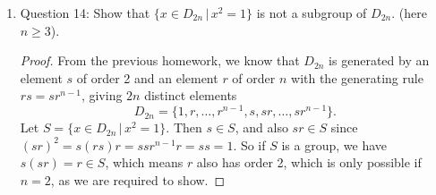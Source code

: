 \documentclass{article}
\begin{document}
\begin{enumerate}
\begin{enumerate}
\begin{proof}
          The given set of elements is not a group because it is not closed
          under addition. In particular, $(1,1)$ and $(-1,0)$ are in the set
          but their sum $(0,1)$ is not.
          inverse
        \end{proof}

      \item Question 14: Show that $\{x\in D_{2n}\,|\,x^2=1\}$ is not a
        subgroup of $D_{2n}$. (here $n\geq3$).

        \begin{proof}
          From the previous homework, we know that $D_{2n}$ is generated by
          an element $s$ of order 2 and an element $r$ of order $n$ with
          the generating rule $rs=sr^{n-1}$, giving $2n$ distinct elements
          \begin{equation*}
            D_{2n} = \{1,r,\ldots,r^{n-1},s,sr,\ldots,sr^{n-1}\}.
          \end{equation*}
          Let $S=\{x\in D_{2n}\,|\,x^2=1\}$. Then $s\in S$, and also $sr\in
          S$ since $(sr)^2=s(rs)r=ssr^{n-1}r=ss=1$. So if $S$ is a group,
          we have $s(sr)=r\in S$, which means $r$ also has order 2, which
          is only possible if $n=2$, as we are required to show. 
        \end{proof}
    \end{enumerate}
\end{enumerate}
\end{document}
